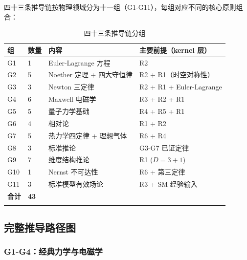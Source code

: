 四十三条推导链按物理领域分为十一组（G1-G11），每组对应不同的核心原则组合：

\begin{center}
\small
\begin{longtable}{p{1.5cm}p{1.2cm}p{4.5cm}p{7cm}}
\toprule
\textbf{组} & \textbf{数量} & \textbf{内容} & \textbf{主要前提（kernel 层）} \\
\midrule
G1 & 1 & Euler-Lagrange 方程 & R2 \\
G2 & 5 & Noether 定理 + 四大守恒律 & R2 + R1（时空对称性）\\
G3 & 3 & Newton 三定律 & R2 + R1 + Euler-Lagrange \\
G4 & 6 & Maxwell 电磁学 & R3 + R2 + R1 \\
G5 & 5 & 量子力学基础 & R4 + R5 + R1 \\
G6 & 4 & 相对论 & R1 + R2 \\
G7 & 5 & 热力学四定律 + 理想气体 & R6 + R4 \\
G8 & 3 & 标准推论 & G3-G7 已证定律 \\
G9 & 7 & 维度结构推论 & R1 ($D=3+1$) \\
G10 & 1 & Nernst 不可达性 & R6 + 第三定律 \\
G11 & 3 & 标准模型有效场论 & R3 + SM 经验输入 \\
\midrule
\textbf{合计} & \textbf{43} & & \\
\bottomrule
\caption{四十三条推导链分组}
\end{longtable}
\end{center}

\subsection{完整推导路径图}

\subsubsection{G1-G4：经典力学与电磁学}

